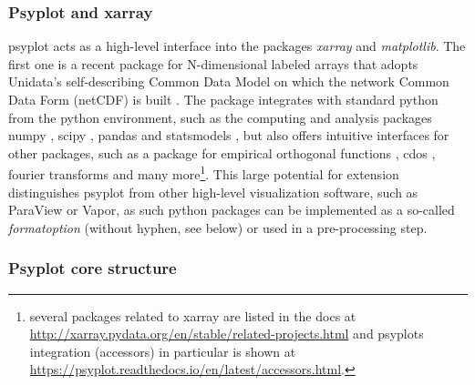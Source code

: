 \begin{refsection}
\subsubsection{Psyplot and xarray}  \label{sec:psyplot-dependencies}

psyplot acts as a high-level interface into the packages \textit{xarray} and \textit{matplotlib}. The first one is a recent package for N-dimensional labeled arrays that adopts Unidata’s self-describing Common Data Model on which the network Common Data Form (netCDF) is built \citep{RewDavis1990, BrownFolkGoucherEtAl1993, HoyerHamman2017}. The package integrates with standard python from the python environment, such as the computing and analysis packages numpy \citep{Oliphant2006}, scipy \citep{JonesOliphantPetersonEtAl2001, Oliphant2007}, pandas \citep{McKinney2010} and statsmodels \citep{SeaboldPerktold2010}, but also offers intuitive interfaces for other packages, such as a package for empirical orthogonal functions \citep[EOFs, ][]{Dawson2016}, \glspl{cdo} \citep{Mueller2019}, fourier transforms \citep{UchidaRokemNicholasEtAl2019} and many more\footnote{\label{foot:xraccessors} several packages related to xarray are listed in the docs at \url{http://xarray.pydata.org/en/stable/related-projects.html} and psyplots integration (accessors) in particular is shown at \url{https://psyplot.readthedocs.io/en/latest/accessors.html}.}. This large potential for extension distinguishes psyplot from other high-level visualization software, such as ParaView or Vapor, as such python packages can be implemented as a so-called \textit{formatoption} (without hyphen, see below) or used in a pre-processing step.

\subsubsection{Psyplot core structure}  \label{sec:psyplot-core}  


\end{refsection}
